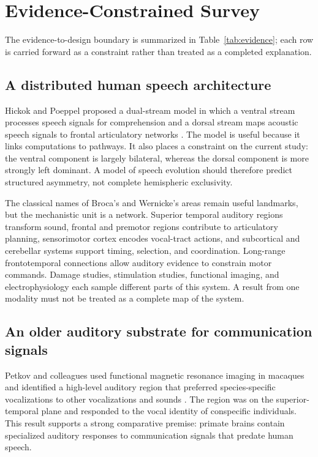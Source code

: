 \documentclass[conference]{IEEEtran}
\begin{document}
\section{Evidence-Constrained Survey}

The evidence-to-design boundary is summarized in Table~\ref{tab:evidence}; each row is carried forward as a constraint rather than treated as a completed explanation.

\subsection{A distributed human speech architecture}

Hickok and Poeppel proposed a dual-stream model in which a ventral stream processes speech signals for comprehension and a dorsal stream maps acoustic speech signals to frontal articulatory networks \cite{hickok2007}. The model is useful because it links computations to pathways. It also places a constraint on the current study: the ventral component is largely bilateral, whereas the dorsal component is more strongly left dominant. A model of speech evolution should therefore predict structured asymmetry, not complete hemispheric exclusivity.

The classical names of Broca's and Wernicke's areas remain useful landmarks, but the mechanistic unit is a network. Superior temporal auditory regions transform sound, frontal and premotor regions contribute to articulatory planning, sensorimotor cortex encodes vocal-tract actions, and subcortical and cerebellar systems support timing, selection, and coordination. Long-range frontotemporal connections allow auditory evidence to constrain motor commands. Damage studies, stimulation studies, functional imaging, and electrophysiology each sample different parts of this system. A result from one modality must not be treated as a complete map of the system.

\subsection{An older auditory substrate for communication signals}

Petkov and colleagues used functional magnetic resonance imaging in macaques and identified a high-level auditory region that preferred species-specific vocalizations to other vocalizations and sounds \cite{petkov2008}. The region was on the superior-temporal plane and responded to the vocal identity of conspecific individuals. This result supports a strong comparative premise: primate brains contain specialized auditory responses to communication signals that predate human speech.
\end{document}
